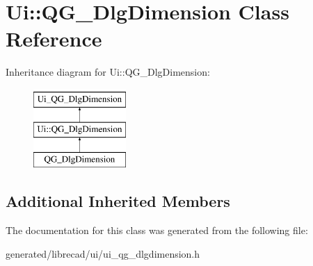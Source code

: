 \hypertarget{classUi_1_1QG__DlgDimension}{\section{Ui\-:\-:Q\-G\-\_\-\-Dlg\-Dimension Class Reference}
\label{classUi_1_1QG__DlgDimension}
}
Inheritance diagram for Ui\-:\-:Q\-G\-\_\-\-Dlg\-Dimension\-:\begin{figure}[H]
\begin{center}
\leavevmode
\includegraphics[height=3.000000cm]{classUi_1_1QG__DlgDimension}
\end{center}
\end{figure}
\subsection*{Additional Inherited Members}


The documentation for this class was generated from the following file\-:\begin{DoxyCompactItemize}
\item 
generated/librecad/ui/ui\-\_\-qg\-\_\-dlgdimension.\-h\end{DoxyCompactItemize}
